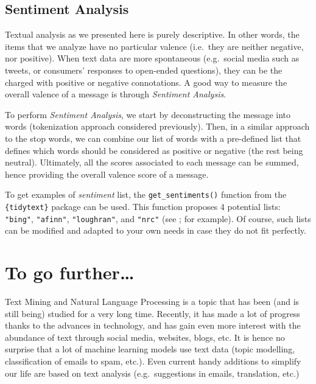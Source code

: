 \documentclass[
]{krantz}
\begin{document}
\hypertarget{sentiment-analysis}{%
\subsection{Sentiment Analysis}\label{sentiment-analysis}}

Textual analysis as we presented here is purely descriptive. In other words, the items that we analyze have no particular valence (i.e.~they are neither negative, nor positive). When text data are more spontaneous (e.g.~social media such as tweets, or consumers' responses to open-ended questions), they can be the charged with positive or negative connotations. A good way to measure the overall valence of a message is through \emph{Sentiment Analysis}.

To perform \emph{Sentiment Analysis}, we start by deconstructing the message into words (tokenization approach considered previously). Then, in a similar approach to the stop words, we can combine our list of words with a pre-defined list that defines which words should be considered as positive or negative (the rest being neutral). Ultimately, all the scores associated to each message can be summed, hence providing the overall valence score of a message.

To get examples of \emph{sentiment} list, the \texttt{get\_sentiments()} function from the \texttt{\{tidytext\}} package can be used. This function proposes 4 potential lists: \texttt{"bing"}, \texttt{"afinn"}, \texttt{"loughran"}, and \texttt{"nrc"} (see \citet{Liu2015}; \citet{Mohammad13} for example). Of course, such lists can be modified and adapted to your own needs in case they do not fit perfectly.

\hypertarget{to-go-further-1}{%
\section{To go further\ldots{}}\label{to-go-further-1}}

Text Mining and Natural Language Processing is a topic that has been (and is still being) studied for a very long time. Recently, it has made a lot of progress thanks to the advances in technology, and has gain even more interest with the abundance of text through social media, websites, blogs, etc. It is hence no surprise that a lot of machine learning models use text data (topic modelling, classification of emails to spam, etc.). Even current handy additions to simplify our life are based on text analysis (e.g.~suggestions in emails, translation, etc.)
\end{document}
